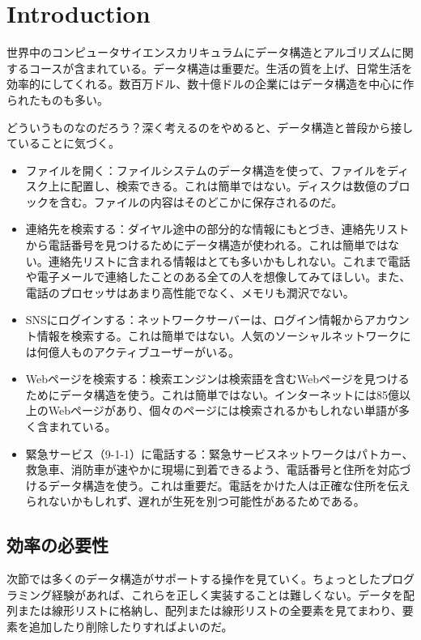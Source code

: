 \chapter{Introduction}

世界中のコンピュータサイエンスカリキュラムにデータ構造とアルゴリズムに関するコースが含まれている。データ構造は重要だ。生活の質を上げ、日常生活を効率的にしてくれる。数百万ドル、数十億ドルの企業にはデータ構造を中心に作られたものも多い。

どういうものなのだろう？深く考えるのをやめると、データ構造と普段から接していることに気づく。
\begin{itemize}
	\item ファイルを開く：ファイルシステムのデータ構造を使って、ファイルをディスク上に配置し、検索できる。これは簡単ではない。ディスクは数億のブロックを含む。ファイルの内容はそのどこかに保存されるのだ。
	\item 連絡先を検索する：ダイヤル途中の部分的な情報にもとづき、連絡先リストから電話番号を見つけるためにデータ構造が使われる。これは簡単ではない。連絡先リストに含まれる情報はとても多いかもしれない。これまで電話や電子メールで連絡したことのある全ての人を想像してみてほしい。また、電話のプロセッサはあまり高性能でなく、メモリも潤沢でない。
	\item SNSにログインする：ネットワークサーバーは、ログイン情報からアカウント情報を検索する。これは簡単ではない。人気のソーシャルネットワークには何億人ものアクティブユーザーがいる。
	\item Webページを検索する：検索エンジンは検索語を含むWebページを見つけるためにデータ構造を使う。これは簡単ではない。インターネットには85億以上のWebページがあり、個々のページには検索されるかもしれない単語が多く含まれている。
	\item 緊急サービス（9-1-1）に電話する：緊急サービスネットワークはパトカー、救急車、消防車が速やかに現場に到着できるよう、電話番号と住所を対応づけるデータ構造を使う。これは重要だ。電話をかけた人は正確な住所を伝えられないかもしれず、遅れが生死を別つ可能性があるためである。
\end{itemize}

\section{効率の必要性}

次節では多くのデータ構造がサポートする操作を見ていく。ちょっとしたプログラミング経験があれば、これらを正しく実装することは難しくない。データを配列または線形リストに格納し、配列または線形リストの全要素を見てまわり、要素を追加したり削除したりすればよいのだ。

